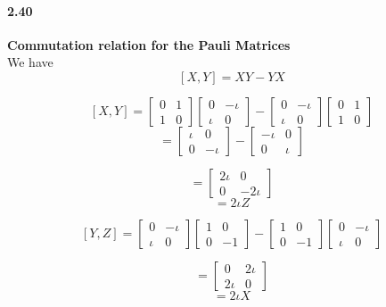 
\paragraph{2.40} \textbf{Commutation relation for the Pauli Matrices} \\%
We have 
$$ [X,Y] = XY-YX$$

$$ [X,Y] = \begin{bmatrix}
    0 & 1 \\ 1 & 0
\end{bmatrix} \begin{bmatrix}
    0 & -\iota \\ \iota & 0
\end{bmatrix} - \begin{bmatrix}
    0 & -\iota \\ \iota & 0
\end{bmatrix} \begin{bmatrix}
    0 & 1 \\ 1 & 0
\end{bmatrix}$$
$$ = \begin{bmatrix}
    \iota & 0 \\ 0 & -\iota
\end{bmatrix} - \begin{bmatrix}
    -\iota & 0 \\ 0 & \iota
\end{bmatrix}$$

$$ = 
\begin{bmatrix}
    2 \iota & 0 \\ 0 & -2 \iota
\end{bmatrix}$$
 $$ = 2 \iota Z$$

 $$ [Y,Z]= \begin{bmatrix}
    0 & -\iota \\ \iota & 0
\end{bmatrix} \begin{bmatrix}
    1 & 0 \\ 0 & -1
\end{bmatrix} - \begin{bmatrix}
    1 & 0 \\ 0 & -1
\end{bmatrix} \begin{bmatrix}
    0 & -\iota \\ \iota & 0
\end{bmatrix}$$


$$ = 
\begin{bmatrix}
    0 & 2\iota \\ 2\iota & 0
\end{bmatrix}$$
 $$ = 2 \iota X$$

